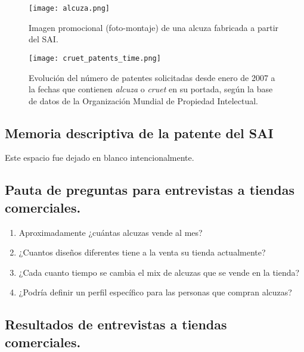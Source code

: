 \begin{figure}
  \texttt{[image: alcuza.png]}
  \caption{Imagen promocional (foto-montaje) de una alcuza fabricada a partir del SAI.}
  \label{foto_alcuza}
\end{figure}
\begin{figure}[hb]
  \texttt{[image: cruet\_patents\_time.png]}
  \caption{Evolución del número de patentes solicitadas desde enero de 2007 a la fechas que contienen \textit{alcuza} o \textit{cruet} en su portada, según la base de datos de la Organización Mundial de Propiedad Intelectual.}
  \label{alcuzas_tiempo}
\end{figure}

\newpage

\subsection{Memoria descriptiva de la patente del SAI}
\label{memoria}
\vspace{7cm}
\begin{center}

  Este espacio fue dejado en blanco intencionalmente.
\end{center}



\newpage
\subsection{ Pauta de preguntas para entrevistas a tiendas comerciales.}
\label{PauEntRetail}

\begin{enumerate}
\item Aproximadamente ¿cuántas alcuzas vende al mes?
\item ¿Cuantos diseños diferentes tiene a la venta su tienda actualmente?
\item ¿Cada cuanto tiempo se cambia el mix de alcuzas que se vende en la tienda?
\item ¿Podría definir un perfil específico para las personas que compran alcuzas?
\end{enumerate}

\newpage
\subsection{Resultados de entrevistas a tiendas comerciales.}
\label{ResEntRetail}




